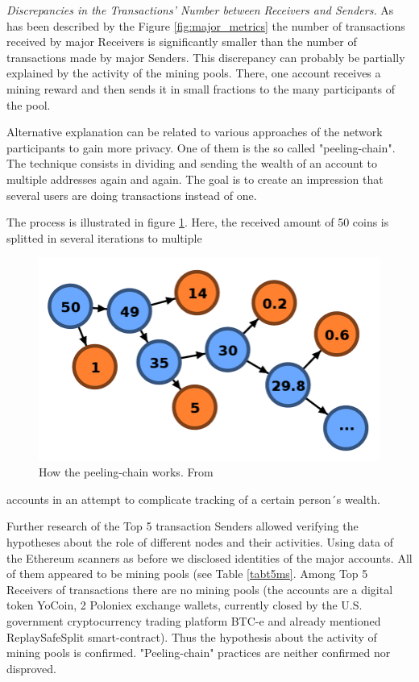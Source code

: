 \textit{Discrepancies in the Transactions' Number between Receivers and Senders.} 
As has been described by the Figure \ref{fig:major_metrics} the number of transactions received by major Receivers is significantly smaller than the number of transactions made by major Senders.
This discrepancy can probably be partially explained by the activity of the mining pools.
There, one account receives a mining reward and then sends it in small fractions to the many participants of the pool.

Alternative explanation can be related to various approaches of the network participants to gain more privacy.
One of them is the so called "peeling-chain".
The technique consists in dividing and sending the wealth of an account to multiple addresses again and again.
The goal is to create an impression that several users are doing transactions instead of one.

The process is illustrated in figure \ref{fig:peeling_chain}.
Here, the received amount of 50 coins is splitted in several iterations to multiple {\par}

\begin{figure}[ht]
  \centering
  \includegraphics[width=\linewidth]{figures/peelingchain.png}
  \caption{How the peeling-chain works. From \cite{balthasar2017laundary}}
  \label{fig:peeling_chain}
\end{figure}

\noindent accounts in an attempt to complicate tracking of a certain person´s wealth.


Further research of the Top 5 transaction Senders allowed verifying the hypotheses about the role of different nodes and their activities.
Using data of the Ethereum scanners as before we disclosed identities of the major accounts. 
All of them appeared to be mining pools (see Table \ref{tabt5ms}.
Among Top 5 Receivers of transactions there are no mining pools (the accounts are a digital token YoCoin, 2 Poloniex exchange wallets, currently closed by the U.S. government cryptocurrency trading platform BTC-e and already mentioned ReplaySafeSplit smart-contract).
Thus the hypothesis about the activity of mining pools is confirmed.
"Peeling-chain" practices are neither confirmed nor disproved.

